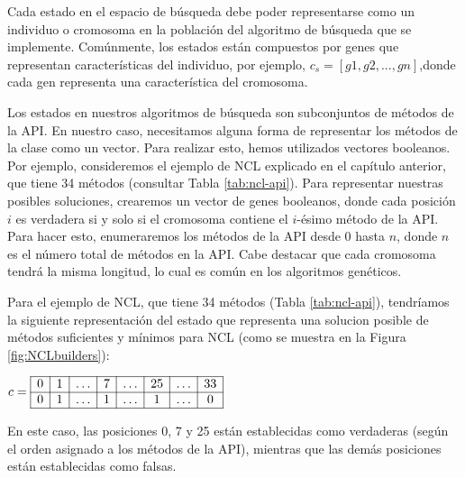Cada estado en el espacio de búsqueda debe poder representarse como un individuo o
cromosoma en la población del algoritmo de búsqueda que se implemente. 
Comúnmente, los estados están compuestos por genes que representan características del individuo, por ejemplo,
$c_s = [g1, g2, ..., gn]$,donde cada gen representa una característica del cromosoma.


Los estados en nuestros algoritmos de búsqueda son subconjuntos de métodos de la API.  En nuestro caso, necesitamos alguna forma de representar los métodos de la clase como un vector. Para realizar esto, hemos utilizados vectores booleanos. Por ejemplo, consideremos el ejemplo de NCL explicado en el capítulo anterior, que tiene 34 métodos (consultar Tabla \ref{tab:ncl-api}).
Para representar nuestras posibles soluciones, crearemos un vector de genes booleanos, donde cada posición $i$ es verdadera si y solo si el cromosoma contiene el $i$-ésimo método de la API. Para hacer esto, enumeraremos los métodos de la API desde 0 hasta $n$, donde $n$ es el número total de métodos en la API. Cabe destacar que cada cromosoma tendrá la misma longitud, lo cual es común en los algoritmos genéticos.

Para el ejemplo de NCL, que tiene 34 métodos (Tabla \ref{tab:ncl-api}), tendríamos la siguiente representación del estado que representa una solucion posible de métodos suficientes y mínimos para NCL (como se muestra en la Figura \ref{fig:NCLbuilders}):
\begin{center}
$c = \begin{array}{|*{8}{c|}}
\hline
 0 & 1 & \ldots & 7 & \ldots & 25 & \ldots & 33 \\
\hline
0 & 1 & \ldots & 1 & \ldots & 1 & \ldots & 0 \\
\hline
\end{array}$
\end{center}



En este caso, las posiciones 0, 7 y 25 están establecidas como verdaderas (según el orden asignado a los métodos de la API), mientras que las demás posiciones están establecidas como falsas.

